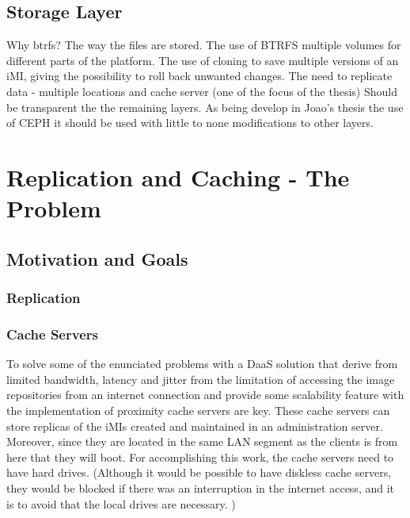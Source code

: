 \subsection{Storage Layer}
\label{sub:icbd_architecture_storage}

Why btrfs?
The way the files are stored.
The use of BTRFS multiple volumes for different parts of the platform.
The use of cloning to save multiple versions of an iMI, giving the possibility to roll back unwanted changes.
The need to replicate data - multiple locations and cache server (one of the focus of the thesis)
Should be transparent the the remaining layers. As being develop in Joao's thesis the use of CEPH it should be used with little to none modifications to other layers.


\section{Replication and Caching - The Problem}
\label{sec:replication_cache}


\subsection{Motivation and Goals}
\label{sub:motivation_goals}

\subsubsection{Replication}

\subsubsection{Cache Servers}

To solve some of the enunciated problems with a DaaS solution that derive from limited bandwidth, latency and jitter from the limitation of accessing the image repositories from an internet connection and provide some scalability feature with the implementation of proximity cache servers are key. These cache servers can store replicas of the iMIs created and maintained in an administration server. Moreover, since they are located in the same LAN segment as the clients is from here that they will boot.
For accomplishing this work, the cache servers need to have hard drives. (Although it would be possible to have diskless cache servers, they would be blocked if there was an interruption in the internet access, and it is to avoid that the local drives are necessary. )

